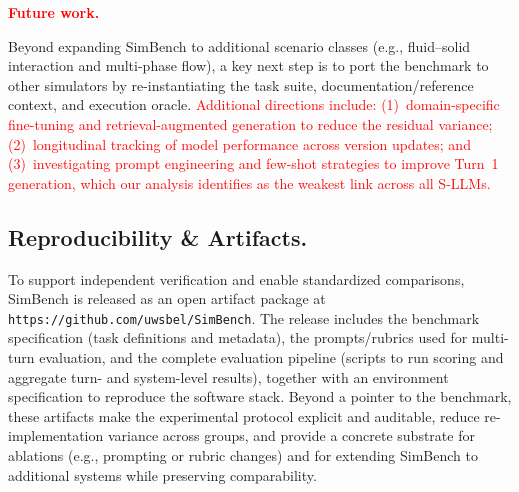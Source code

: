 \documentclass{ieeeaccess}
\newcommand{\updatedText}[1]{\textcolor{red}{#1}}
\newcommand{\noindentBold}[1]{\par\noindent\textbf{#1}}
\begin{document}
\updatedText{\noindentBold{Future work.}}
Beyond expanding SimBench to additional scenario classes (e.g., fluid--solid interaction and multi-phase flow), a key next step is to port the benchmark to other simulators by re-instantiating the task suite, documentation/reference context, and execution oracle.
\updatedText{Additional directions include: (1)~domain-specific fine-tuning and retrieval-augmented generation to reduce the residual variance; 
(2)~longitudinal tracking of model performance across version updates; and 
(3)~investigating prompt engineering and few-shot strategies to improve Turn~1 generation, which our analysis identifies as the weakest link across all S-LLMs.}

\FloatBarrier 
\subsection*{Reproducibility \& Artifacts.}
To support independent verification and enable standardized comparisons, SimBench is released as an open artifact package at \texttt{https://github.com/uwsbel/SimBench}. The release includes the benchmark specification (task definitions and metadata), the prompts/rubrics used for multi-turn evaluation, and the complete evaluation pipeline (scripts to run scoring and aggregate turn- and system-level results), together with an environment specification to reproduce the software stack. Beyond a pointer to the benchmark, these artifacts make the experimental protocol explicit and auditable, reduce re-implementation variance across groups, and provide a concrete substrate for ablations (e.g., prompting or rubric changes) and for extending SimBench to additional systems while preserving comparability.





\end{document}
